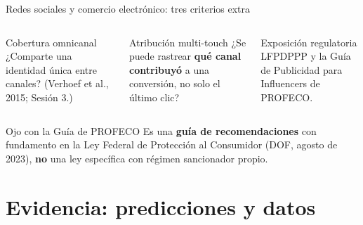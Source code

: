 \documentclass[aspectratio=169,xcolor=dvipsnames]{beamer}
\begin{document}
\begin{frame}{Redes sociales y comercio electrónico: tres criterios extra}
\begin{columns}[T]
  \begin{block}{Cobertura omnicanal}
    \small ¿Comparte una identidad única entre canales? (Verhoef et al., 2015; Sesión 3.)
  \end{block}
  \begin{exampleblock}{Atribución multi-touch}
    \small ¿Se puede rastrear \textbf{qué canal contribuyó} a una conversión, no solo el último clic?
  \end{exampleblock}
  \begin{block}{Exposición regulatoria}
    \small LFPDPPP y la Guía de Publicidad para Influencers de PROFECO.
  \end{block}
\end{columns}
\vspace{6pt}
\begin{alertblock}{Ojo con la Guía de PROFECO}
  \small Es una \textbf{guía de recomendaciones} con fundamento en la Ley Federal de Protección al Consumidor (DOF, agosto de 2023), \textbf{no} una ley específica con régimen sancionador propio.
\end{alertblock}
\end{frame}

\section[Evidencia]{Evidencia: predicciones y datos}
\end{document}
